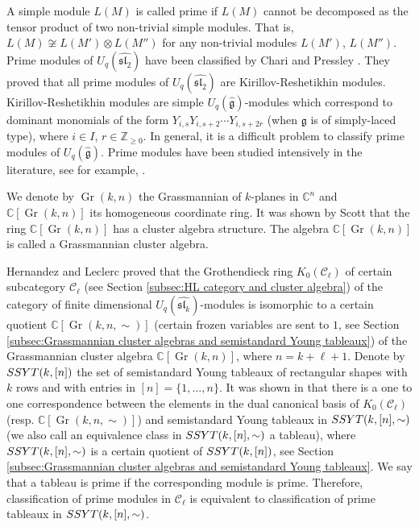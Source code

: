\documentclass[12pt, reqno]{amsart}
\theoremstyle{plain}
\theoremstyle{definition}
\numberwithin{equation}{section}
\newcommand{\CC}{{\mathbb {C}}}
\newcommand{\SSYT}{{\rm SSYT}}
\DeclareMathOperator{\Gr}{Gr}
\begin{document}
A simple module $L(M)$ is called prime if $L(M)$ cannot be decomposed as the tensor product of two non-trivial simple modules. That is, $L(M) \not\cong L(M') \otimes L(M'')$ for any non-trivial modules $L(M')$, $L(M'')$. Prime modules of $U_q(\widehat{\mathfrak{sl}_2})$ have been classified by Chari and Pressley \cite{CP97}. They proved that all prime modules of $U_q(\widehat{\mathfrak{sl}_2})$ are Kirillov-Reshetikhin modules. Kirillov-Reshetikhin modules are simple $U_q(\widehat{\mathfrak{g}})$-modules which correspond to dominant monomials of the form $Y_{i,s}Y_{i,s+2} \cdots Y_{i,s+2r}$ (when $\mathfrak{g}$ is of simply-laced type), where $i \in I$, $r \in \mathbb{Z}_{\ge 0}$. In general, it is a difficult problem to classify prime modules of $U_q(\widehat{\mathfrak{g}})$. Prime modules have been studied intensively in the literature, see for example, \cite{BCM18, BC22, CMY13, CP96a, CP97, EL23, FM00, HL10, MouS22}.  

We denote by $\Gr(k,n)$ the Grassmannian of $k$-planes in $\mathbb{C}^n$ and $\CC[\Gr(k,n)]$ its homogeneous coordinate ring. It was shown by Scott \cite{Sco06} that the ring $\CC[\Gr(k,n)]$ has a cluster algebra structure. The algebra  $\CC[\Gr(k,n)]$ is called a Grassmannian cluster algebra. 

Hernandez and Leclerc \cite[Section 13]{HL10} proved that the Grothendieck ring $K_0(\mathcal{C}_{\ell})$ of certain subcategory $\mathcal{C}_{\ell}$ (see Section \ref{subsec:HL category and cluster algebra}) of the category of finite dimensional $U_q(\widehat{\mathfrak{sl}_k})$-modules is isomorphic to a certain quotient $\CC[\Gr(k,n,\sim)]$ (certain frozen variables are sent to $1$, see Section \ref{subsec:Grassmannian cluster algebras and semistandard Young tableaux}) of the Grassmannian cluster algebra $\CC[\Gr(k,n)]$, where $n = k+\ell+1$. Denote by $\SSYT(k,[n])$ the set of semistandard Young tableaux of rectangular shapes with $k$ rows and with entries in $[n]=\{1,\ldots, n\}$. 
It was shown in \cite{CDFL} that there is a one to one correspondence between the elements in the dual canonical basis of $K_0(\mathcal{C}_{\ell})$ (resp. $\CC[\Gr(k,n,\sim)]$) and semistandard Young tableaux in $\SSYT(k,[n],\sim)$ (we also call an equivalence class in $\SSYT(k,[n],\sim)$ a tableau), where $\SSYT(k,[n],\sim)$ is a certain quotient of $\SSYT(k,[n])$, see Section \ref{subsec:Grassmannian cluster algebras and semistandard Young tableaux}. We say that a tableau is prime if the corresponding module is prime. Therefore, classification of prime modules in $\mathcal{C}_{\ell}$ is equivalent to classification of prime tableaux in $\SSYT(k,[n],\sim)$.
\end{document}
